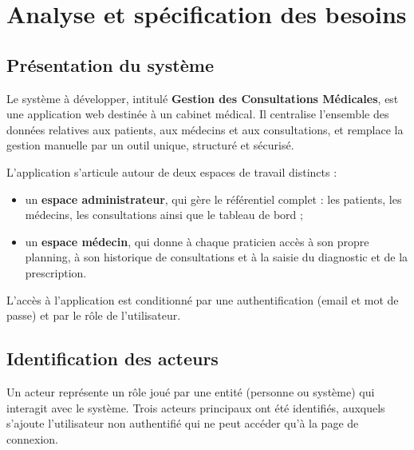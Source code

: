 \chapter{Analyse et spécification des besoins}

\section{Présentation du système}

Le système à développer, intitulé \textbf{Gestion des Consultations Médicales}, est une application web destinée à un cabinet médical. Il centralise l'ensemble des données relatives aux patients, aux médecins et aux consultations, et remplace la gestion manuelle par un outil unique, structuré et sécurisé.

L'application s'articule autour de deux espaces de travail distincts :

\begin{itemize}
    \item un \textbf{espace administrateur}, qui gère le référentiel complet : les patients, les médecins, les consultations ainsi que le tableau de bord ;
    \item un \textbf{espace médecin}, qui donne à chaque praticien accès à son propre planning, à son historique de consultations et à la saisie du diagnostic et de la prescription.
\end{itemize}

L'accès à l'application est conditionné par une authentification (email et mot de passe) et par le rôle de l'utilisateur.

\section{Identification des acteurs}

Un acteur représente un rôle joué par une entité (personne ou système) qui interagit avec le système. Trois acteurs principaux ont été identifiés, auxquels s'ajoute l'utilisateur non authentifié qui ne peut accéder qu'à la page de connexion.

